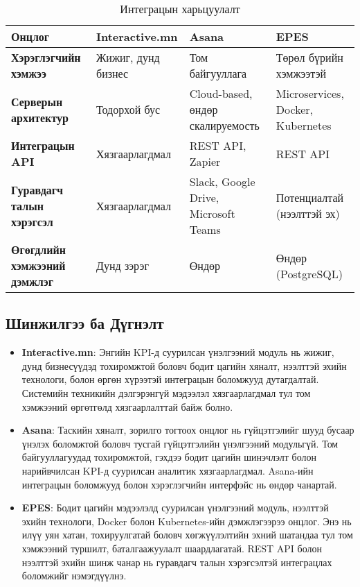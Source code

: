 \begin{table}[h]
\centering
\small
\begin{tabular}{|>{\raggedright\arraybackslash}p{3.5cm}|>{\raggedright\arraybackslash}p{4cm}|>{\raggedright\arraybackslash}p{4cm}|>{\raggedright\arraybackslash}p{4cm}|}
\hline
\textbf{Онцлог} & \textbf{Interactive.mn} & \textbf{Asana} & \textbf{EPES} \\
\hline
\textbf{Хэрэглэгчийн хэмжээ} & Жижиг, дунд бизнес & Том байгууллага & Төрөл бүрийн хэмжээтэй \\
\hline
\textbf{Серверын архитектур} & Тодорхой бус & Cloud-based, өндөр скалируемость & Microservices, Docker, Kubernetes \\
\hline
\textbf{Интеграцын API} & Хязгаарлагдмал & REST API, Zapier & REST API \\
\hline
\textbf{Гуравдагч талын хэрэгсэл} & Хязгаарлагдмал & Slack, Google Drive, Microsoft Teams & Потенциалтай (нээлттэй эх) \\
\hline
\textbf{Өгөгдлийн хэмжээний дэмжлэг} & Дунд зэрэг & Өндөр & Өндөр (PostgreSQL) \\
\hline
\end{tabular}
\caption{Интеграцын харьцуулалт}
\label{tab:scalability_integration}
\end{table}

\subsection{Шинжилгээ ба Дүгнэлт}
\begin{itemize}
    \item \textbf{Interactive.mn}: Энгийн KPI-д суурилсан үнэлгээний модуль нь жижиг, дунд бизнесүүдэд тохиромжтой боловч бодит цагийн хяналт, нээлттэй эхийн технологи, болон өргөн хүрээтэй интеграцын боломжууд дутагдалтай. Системийн техникийн дэлгэрэнгүй мэдээлэл хязгаарлагдмал тул том хэмжээний өргөтгөлд хязгаарлалттай байж болно.
    \item \textbf{Asana}: Таскийн хяналт, зорилго тогтоох онцлог нь гүйцэтгэлийг шууд бусаар үнэлэх боломжтой боловч тусгай гүйцэтгэлийн үнэлгээний модульгүй. Том байгууллагуудад тохиромжтой, гэхдээ бодит цагийн шинэчлэлт болон нарийвчилсан KPI-д суурилсан аналитик хязгаарлагдмал. Asana-ийн интеграцын боломжууд болон хэрэглэгчийн интерфэйс нь өндөр чанартай.
    \item \textbf{EPES}: Бодит цагийн мэдээлэлд суурилсан үнэлгээний модуль, нээлттэй эхийн технологи, Docker болон Kubernetes-ийн дэмжлэгээрээ онцлог. Энэ нь илүү уян хатан, тохируулгатай боловч хөгжүүлэлтийн эхний шатандаа тул том хэмжээний туршилт, баталгаажуулалт шаардлагатай. REST API болон нээлттэй эхийн шинж чанар нь гуравдагч талын хэрэгсэлтэй интеграцлах боломжийг нэмэгдүүлнэ.
\end{itemize}

